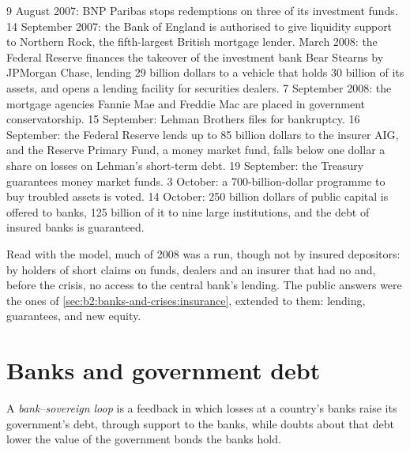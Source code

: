 \begin{record}[2008 step by step]
9 August 2007: BNP Paribas stops redemptions on three of its investment funds.
14 September 2007: the Bank of England is authorised to give liquidity support to Northern Rock, the fifth-largest British
mortgage lender. March 2008: the Federal Reserve finances the takeover of the investment bank Bear Stearns by JPMorgan
Chase, lending 29 billion dollars to a vehicle that holds 30 billion of its assets, and opens a lending facility for
securities dealers. 7 September 2008: the mortgage agencies
Fannie Mae and Freddie Mac are placed in government conservatorship. 15 September: Lehman Brothers files for bankruptcy.
16 September: the Federal Reserve lends up to 85 billion dollars to the insurer AIG, and the Reserve Primary Fund, a money
market fund, falls below one dollar a share on losses on Lehman's short-term debt. 19 September: the Treasury guarantees
money market funds. 3 October: a 700-billion-dollar programme to buy troubled assets is voted. 14 October: 250 billion
dollars of public capital is offered to banks, 125 billion of it to nine large institutions, and the debt of insured banks
is guaranteed.
\end{record}

Read with the model, much of 2008 was a run, though not by insured depositors: by holders of short claims on funds, dealers
and an insurer that had no  and, before the crisis, no access to the central bank's lending. The public answers were the
ones of \cref{sec:b2:banks-and-crises:insurance}, extended to them: lending, guarantees, and new equity.

\section{Banks and government debt}\label{sec:b2:banks-and-crises:sovereign}

\begin{definition}\label{def:b2:banks-and-crises:doom-loop}
A \emph{bank--sovereign loop} is a feedback in which losses at a country's banks raise its
government's debt, through support to the banks, while doubts about that debt lower the value of the government bonds the
banks hold.
\end{definition}

